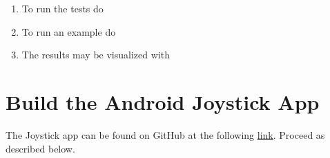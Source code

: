 \begin{enumerate}
	\item To run the tests do
	\newline {}
	\newline {}
	\item To run an example do
	\newline {}
	\newline {}
	\item The results may be visualized with
	\newline {}
	\newline {}
\end{enumerate}
\section{Build the Android Joystick App}
\label{sec::A2_aa}
The Joystick app can be found on GitHub at the following \href{https://github.com/mhubii/ijoy}{\underline{link}}. Proceed as described below.
